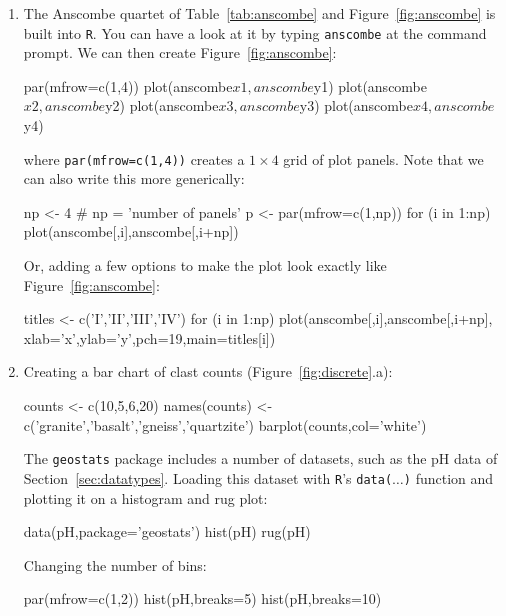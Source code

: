 \begin{enumerate}

\item\label{it:anscombe} The Anscombe quartet of
  Table~\ref{tab:anscombe} and Figure~\ref{fig:anscombe} is built into
  \texttt{R}. You can have a look at it by typing \texttt{anscombe} at
  the command prompt. We can then create Figure~\ref{fig:anscombe}:

\begin{script}
par(mfrow=c(1,4))
plot(anscombe$x1,anscombe$y1)
plot(anscombe$x2,anscombe$y2)
plot(anscombe$x3,anscombe$y3)
plot(anscombe$x4,anscombe$y4)
\end{script}

\noindent where \texttt{par(mfrow=c(1,4))} creates a $1\times{4}$ grid
of plot panels. Note that we can also write this more generically:

\begin{script}
np <- 4 # np = 'number of panels'
p <- par(mfrow=c(1,np))
for (i in 1:np){
  plot(anscombe[,i],anscombe[,i+np])
}
\end{script}

Or, adding a few options to make the plot look exactly like
Figure~\ref{fig:anscombe}:

\begin{script}[firstnumber=3]
titles <- c('I','II','III','IV')
for (i in 1:np){
  plot(anscombe[,i],anscombe[,i+np],
       xlab='x',ylab='y',pch=19,main=titles[i])
}
\end{script}

\item Creating a bar chart of clast counts
  (Figure~\ref{fig:discrete}.a):

\begin{script}
counts <- c(10,5,6,20)
names(counts) <- c('granite','basalt','gneiss','quartzite')
barplot(counts,col='white')
\end{script}

The \texttt{geostats} package includes a number of datasets, such as
the pH data of Section~\ref{sec:datatypes}. Loading this dataset with
\texttt{R}'s \texttt{data($\ldots$)} function and plotting it on a
histogram and rug plot:

\begin{script}
data(pH,package='geostats')
hist(pH)
rug(pH)
\end{script}

Changing the number of bins:

\begin{script}[firstnumber=2]
par(mfrow=c(1,2))
hist(pH,breaks=5)
hist(pH,breaks=10)
\end{script}


\end{enumerate}
